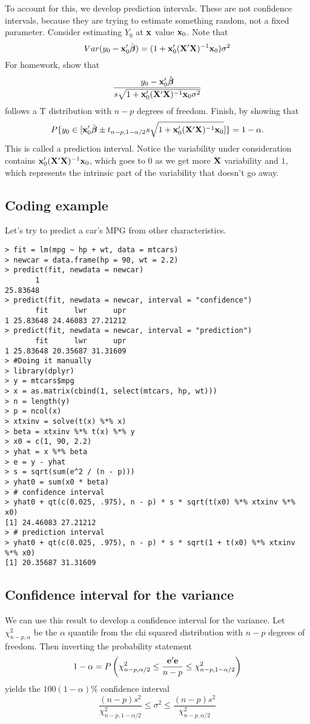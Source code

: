 To account for this, we develop prediction intervals. These
are not confidence intervals, because they are trying to estimate
something random, not a fixed parameter. 
Consider estimating $Y_0$ at $\mathbf{x}$ value $\mathbf{x}_0$. 
Note that
$$
Var(y_0 - \mathbf{x}_0' \hat {\mbox{\boldmath $\beta$}}) = (1 + \mathbf{x}_0' (\mathbf{X}' \mathbf{X})^{-1} \mathbf{x}_0)\sigma^2
$$
For homework,
show that 
$$
\frac{y_0 - \mathbf{x}_0' \hat {\boldsymbol{\beta}}}{s\sqrt{1 + \mathbf{x}_0' (\mathbf{X}' \mathbf{X})^{-1} \mathbf{x}_0 \sigma^2}}
$$
follows a T distribution with $n-p$ degrees of freedom. Finish, by showing that
$$
P\{y_0 \in [\mathbf{x}_0' \hat {\boldsymbol{\beta}}
\pm t_{n-p, 1-\alpha/2} s \sqrt{1 + \mathbf{x}_0' (\mathbf{X}' \mathbf{X})^{-1}  \mathbf{x}_0}]\} = 1 - \alpha.
$$
This is called a prediction interval. Notice the variability under consideration
contains $\mathbf{x}_0' (\mathbf{X}' \mathbf{X})^{-1}  \mathbf{x}_0$, which goes to 0 as we get more $\mathbf{X}$ variability
and $1$, which represents the intrinsic part of the variability that doesn't
go away.


\subsection{Coding example}

Let's try to predict a car's MPG from other characteristics. 

\begin{verbatim}
> fit = lm(mpg ~ hp + wt, data = mtcars)
> newcar = data.frame(hp = 90, wt = 2.2)
> predict(fit, newdata = newcar)
       1 
25.83648 
> predict(fit, newdata = newcar, interval = "confidence")
       fit      lwr      upr
1 25.83648 24.46083 27.21212
> predict(fit, newdata = newcar, interval = "prediction")
       fit      lwr      upr
1 25.83648 20.35687 31.31609
> #Doing it manually
> library(dplyr)
> y = mtcars$mpg
> x = as.matrix(cbind(1, select(mtcars, hp, wt)))
> n = length(y)
> p = ncol(x)
> xtxinv = solve(t(x) %*% x)
> beta = xtxinv %*% t(x) %*% y
> x0 = c(1, 90, 2.2)
> yhat = x %*% beta
> e = y - yhat
> s = sqrt(sum(e^2 / (n - p)))
> yhat0 = sum(x0 * beta)
> # confidence interval
> yhat0 + qt(c(0.025, .975), n - p) * s * sqrt(t(x0) %*% xtxinv %*% x0)
[1] 24.46083 27.21212
> # prediction interval
> yhat0 + qt(c(0.025, .975), n - p) * s * sqrt(1 + t(x0) %*% xtxinv %*% x0)
[1] 20.35687 31.31609
\end{verbatim}






\subsection{Confidence interval for the variance}
We can use this result to develop a confidence interval
for the variance. Let $\chi^2_{n-p, \alpha}$ be the $\alpha$ quantile
from the chi squared distribution with $n-p$ degrees of freedom.
Then inverting the probability statement
$$
1 - \alpha = 
P\left(
\chi^2_{n-p, \alpha/2}
\leq \frac{\mathbf{e}' \mathbf{e}}{n-p}
\leq 
\chi^2_{n-p,1 - \alpha/2}
\right)
$$
yields the $100(1-\alpha)\%$ confidence interval
$$
\frac{(n-p)s^2}{\chi^2_{n-p, 1-\alpha/2}}
\leq \sigma^2
\leq 
\frac{(n-p)s^2}{\chi^2_{n-p, \alpha/2}} 
$$









